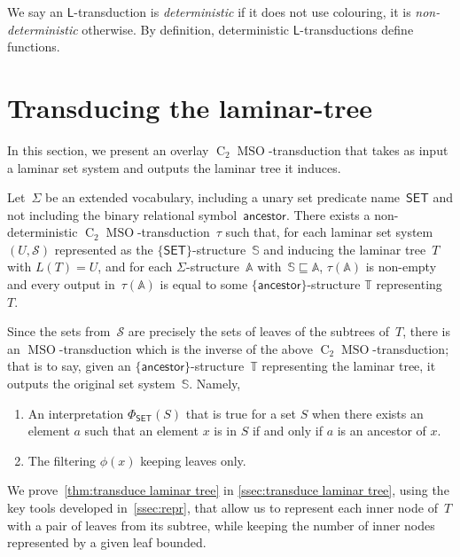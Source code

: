 \documentclass{lmcs} %
\newcommand*\defd[2][\em\color{red!25!black}]{{#1#2}}
\newcommand{\MSO}{\ensuremath{\operatorname{MSO}}\xspace}
\newcommand{\CMSO}[1][]{\ensuremath{\C[#1]{\!\!}\MSO}\xspace}
\newcommand{\C}[1][]{\ensuremath{\operatorname{C}_{#1}}\xspace}
\newcommand{\ancestor}{\mathsf{ancestor}}
\newcommand{\SET}{\ensuremath{\mathsf{SET}}\xspace}
\begin{document}
We say an $\mathsf{L}$-transduction is \defd{deterministic} if it does not use colouring,
it is \defd{non-deterministic} otherwise.
By definition, deterministic $\mathsf{L}$-transductions define functions.

\section{Transducing the laminar-tree}
\label{sec:transduce laminar tree}
In this section,
we present an overlay \CMSO[2]-transduction
that takes as input a laminar set system
and outputs the laminar tree it induces.

\begin{thm}
    \label{thm:transduce laminar tree}
    Let~$\Sigma$ be an extended vocabulary,
    including a unary set predicate name~$\SET$
    and not including the binary relational symbol~$\ancestor$.
    There exists a non-deterministic \CMSO[2]-transduction~$\tau$
    such that,
    for each laminar set system~$(U,\mathcal{S})$
    represented as the $\{\SET\}$-structure~$\mathbb{S}$
    and inducing the laminar tree~$T$ with ${L(T)=U}$,
    and for each $\Sigma$-structure~$\mathbb{A}$
    with~$\mathbb{S}\sqsubseteq\mathbb{A}$,
    $\tau(\mathbb{A})$ is non-empty
    and every output in~$\tau(\mathbb{A})$
    is equal to some $\{\ancestor\}$-structure $\mathbb{T}$ representing~$T$.
\end{thm}

Since the sets from~$\mathcal{S}$
are precisely the sets of leaves of the subtrees of~$T$,
there is an \MSO-transduction
which is the inverse of the above \CMSO[2]-transduction;
that is to say, given an $\{\ancestor\}$-structure~$\mathbb{T}$ representing the laminar tree, it
outputs the original set system~$\mathbb{S}$.
Namely,
\begin{enumerate}[nosep]
    \item An interpretation $\Phi_{\SET}(S)$
    that is true for a set $S$ when there exists an element $a$ such that an element $x$ is in $S$ if and only if $a$ is an ancestor of $x$.
    \item The filtering $\phi(x)$ keeping leaves only.
\end{enumerate}
\medbreak

We prove~\autoref{thm:transduce laminar tree} in \autoref{ssec:transduce laminar tree},
using the key tools developed in~\autoref{ssec:repr},
that allow us to represent each inner node of~$T$ with a pair of leaves from its subtree,
while keeping the number of inner nodes represented by a given leaf bounded.
\end{document}
